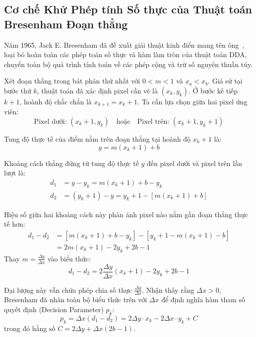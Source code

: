 \subsection{Cơ chế Khử Phép tính Số thực của Thuật toán Bresenham Đoạn thẳng}
\label{subsec:w4_bres_vs_dda}

Năm 1965, Jack E. Bresenham đã đề xuất giải thuật kinh điển mang tên ông~\citep{bresenham1965algorithm}, loại bỏ hoàn toàn các phép toán số thực và hàm làm tròn của thuật toán DDA, chuyển toàn bộ quá trình tính toán về các phép cộng và trừ số nguyên thuần túy.

Xét đoạn thẳng trong bát phân thứ nhất với $0 < m < 1$ và $x_a < x_b$. Giả sử tại bước thứ $k$, thuật toán đã xác định pixel cần vẽ là $(x_k, y_k)$. Ở bước kế tiếp $k+1$, hoành độ chắc chắn là $x_{k+1} = x_k + 1$. Ta cần lựa chọn giữa hai pixel ứng viên:
\begin{equation}
\text{Pixel dưới: } (x_k + 1, y_k) \quad \text{hoặc} \quad \text{Pixel trên: } (x_k + 1, y_k + 1)
\end{equation}

Tung độ thực tế của điểm nằm trên đoạn thẳng tại hoành độ $x_k + 1$ là:
\begin{equation}
y = m(x_k + 1) + b
\end{equation}

Khoảng cách thẳng đứng từ tung độ thực tế $y$ đến pixel dưới và pixel trên lần lượt là:
\begin{align}
d_1 &= y - y_k = m(x_k + 1) + b - y_k \\
d_2 &= (y_k + 1) - y = y_k + 1 - [m(x_k + 1) + b]
\end{align}

Hiệu số giữa hai khoảng cách này phản ánh pixel nào nằm gần đoạn thẳng thực tế hơn:
\begin{align}
d_1 - d_2 &= [m(x_k + 1) + b - y_k] - [y_k + 1 - m(x_k + 1) - b] \nonumber \\
&= 2m(x_k + 1) - 2y_k + 2b - 1
\end{align}
Thay $m = \frac{\Delta y}{\Delta x}$ vào biểu thức:
\begin{equation}
d_1 - d_2 = 2 \frac{\Delta y}{\Delta x}(x_k + 1) - 2y_k + 2b - 1
\end{equation}

Đại lượng này vẫn chứa phép chia số thực $\frac{\Delta y}{\Delta x}$. Nhận thấy rằng $\Delta x > 0$, Bresenham đã nhân toàn bộ biểu thức trên với $\Delta x$ để định nghĩa hàm tham số quyết định (Decision Parameter) $p_k$:
\begin{equation}
p_k = \Delta x (d_1 - d_2) = 2\Delta y \cdot x_k - 2\Delta x \cdot y_k + C \label{eq:w4_pk}
\end{equation}
trong đó hằng số $C = 2\Delta y + \Delta x(2b - 1)$.

